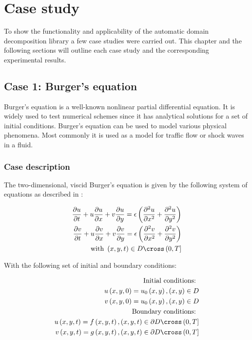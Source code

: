 \section{Case study}

To show the functionality and applicability of the automatic domain decomposition library a few case studies were carried out.
This chapter and the following sections will outline each case study and the corresponding experimental results.

\subsection{Case 1: Burger's equation}
Burger's equation is a well-known nonlinear partial differential equation.
It is widely used to test numerical schemes since it has analytical solutions for a set of initial conditions.
Burger's equation can be used to model various physical phenomena.
Most commonly it is used as a model for traffic flow or shock waves in a fluid.

\subsubsection{Case description}

The two-dimensional, viscid Burger's equation is given by the following system of equations as described in \citet{zhao2011new}:

\begin{equation}
\begin{split}
\pdv{u}{t} + u \pdv{u}{x} + v \pdv{u}{y} = \epsilon \left( \pdv{^2 u}{x^2} + \pdv{^2 u}{y^2} \right) \\
\pdv{v}{t} + u \pdv{v}{x} + v \pdv{v}{y} = \epsilon \left( \pdv{^2 v}{x^2} + \pdv{^2 v}{y^2} \right) \\
\text{with } \left(x, y, t\right) \in D \cross \left(0,T\right]
\end{split}
\end{equation}

With the following set of initial and boundary conditions: 

\begin{equation}
\begin{split}
\text{Initial conditions: } \\
u\left(x, y, 0\right) = u_0\left(x, y\right), \left(x, y\right) \in D \\
v\left(x, y, 0\right) = u_0\left(x, y\right), \left(x, y\right) \in D \\
\text{Boundary conditions: } \\
u\left(x, y, t\right) = f\left(x, y, t\right), \left(x, y, t\right) \in \partial D \cross \left(0, T\right] \\
v\left(x, y, t\right) = g\left(x, y, t\right), \left(x, y, t\right) \in \partial D \cross \left(0, T\right]
\end{split}
\end{equation}


